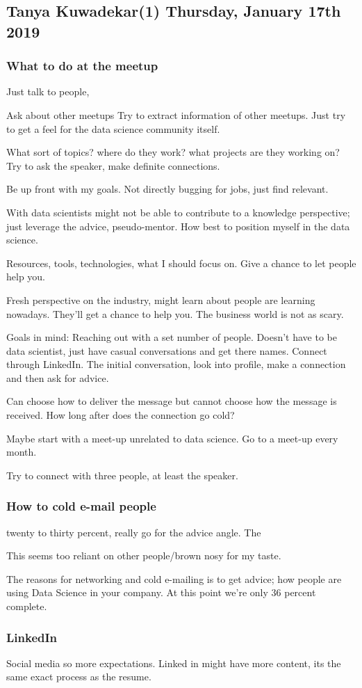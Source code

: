 \subsection{Tanya Kuwadekar(1) Thursday, January 17th 2019}

\subsubsection{What to do at the meetup}
Just talk to people,

Ask about other meetups
Try to extract information of other meetups.
Just try to get a feel for the data science community itself.

What sort of topics?
where do they work?
what projects are they working on?
Try to ask the speaker, make definite connections.

Be up front with my goals. Not
directly bugging for jobs, just find relevant.

With data scientists might not be able to contribute
to a knowledge perspective; just leverage the advice,
pseudo-mentor. How best to position myself in the data
science.

Resources, tools, technologies, what I should focus on.
Give a chance to let people help you. 

Fresh perspective on the industry, might learn about
people are learning nowadays. They'll get a chance to help
you. The business world is not as scary. 

Goals in mind: Reaching out with a set number of people.
Doesn't have to be data scientist, just have casual conversations
and get there names. Connect through LinkedIn.
The initial conversation, look into profile, make a connection
and then ask for advice. 

Can choose how to deliver the message but cannot choose how the
message is received. 
How long after does the connection go cold?

Maybe start with a meet-up unrelated to data science. 
Go to a meet-up every month. 

Try to connect with three people, at least the speaker.


\subsubsection{How to cold e-mail people}
twenty to thirty percent, really go for the advice angle.
The 

This seems too reliant on other people/brown nosy
for my taste.


The reasons for networking and cold e-mailing is to get
advice; how people are using Data Science in your company.
At this point we're only 36 percent complete.

\subsubsection{LinkedIn}
Social media so more expectations. Linked in might have more
content, its the same exact process as the resume.





